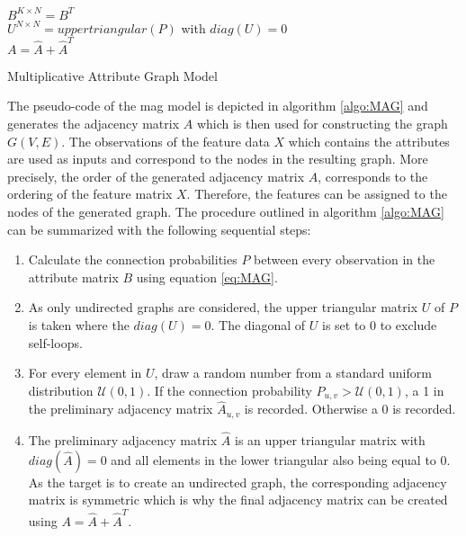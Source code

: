	\begin{algorithm}[h]
		\scriptsize
		\SetAlgoLined
		\nl $B^{K \times N} = B^{T}$ \\
		\nl {}
		\nl $U^{N \times N} = uppertriangular(P)$ with $diag(U)=0$\\
		\nl {}
		\nl $A = \hat A + \hat A^{T}$
		\caption{Multiplicative Attribute Graph Model}
		\label{algo:MAG}
	\end{algorithm}

	\noindent The pseudo-code of the \acs{mag} model is depicted in algorithm 
	\ref{algo:MAG} and generates the adjacency matrix $A$ which is then used 
	for constructing the graph $G(V,E)$. The observations of the feature data 
	$X$ which contains the attributes are used as inputs and correspond to the 
	nodes in the resulting graph. More precisely, the order of the generated 
	adjacency matrix $A$, corresponds to the ordering of the feature matrix $X$. 
	Therefore, the features can be assigned to the nodes of the generated graph. 
	The procedure outlined in algorithm \ref{algo:MAG} can be summarized with 
	the following sequential steps:

	\begin{enumerate}
		\item Calculate the connection probabilities $P$ between every 
			observation in the attribute matrix $B$ using equation \ref{eq:MAG}. 
		\item As only undirected graphs are considered, the upper triangular
			matrix $U$ of $P$ is taken where the $diag(U) = 0$. The diagonal of
			$U$ is set to 0 to exclude self-loops.
		\item For every element in $U$, draw a random number from a standard
			uniform distribution $\mathcal{U}(0,1)$. If the connection
			probability $P_{u,v}>\mathcal{U}(0,1)$, a 1 in the
			preliminary adjacency matrix $\hat A_{u,v}$ is recorded.
			Otherwise a 0 is recorded.
		\item The preliminary adjacency matrix $\hat A$ is an upper triangular
			matrix with $diag(\hat A) = 0$ and all elements in the lower
			triangular also being equal to 0. As the target is to create an
			undirected graph, the corresponding adjacency matrix is symmetric
			which is why the final adjacency matrix can be created using 
			$A = \hat A + \hat A^{T}$. 
	\end{enumerate}
 
